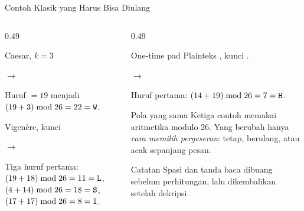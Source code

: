 \documentclass[aspectratio=169,11pt]{beamer}
\begin{document}
\begin{frame}{Contoh Klasik yang Harus Bisa Diulang}
    \scriptsize
    \begin{columns}[T,onlytextwidth]
        \begin{column}{0.49\textwidth}
            \begin{exampleblock}{Caesar, $k=3$}
                \par\vspace{2pt}
                $\longrightarrow$ 
                \par\vspace{2pt}
                Huruf  $=19$ menjadi $(19+3)\bmod 26=22=\texttt{W}$.
            \end{exampleblock}
            \begin{exampleblock}{Vigen\`ere, kunci }
                \par\vspace{2pt}
                $\longrightarrow$ 
                \par\vspace{2pt}
                Tiga huruf pertama: $(19+18)\bmod 26=11=\texttt{L}$,
                $(4+14)\bmod 26=18=\texttt{S}$,
                $(17+17)\bmod 26=8=\texttt{I}$.
            \end{exampleblock}
        \end{column}
        \begin{column}{0.49\textwidth}
            \begin{exampleblock}{One-time pad}
                Plainteks , kunci .
                \par\vspace{2pt}
                $\longrightarrow$ 
                \par\vspace{2pt}
                Huruf pertama: $(14+19)\bmod 26=7=\texttt{H}$.
            \end{exampleblock}
            \begin{alertblock}{Pola yang sama}
                Ketiga contoh memakai aritmetika modulo 26. Yang berubah hanya
                \emph{cara memilih pergeseran}: tetap, berulang, atau acak
                sepanjang pesan.
            \end{alertblock}
            \begin{block}{Catatan}
                Spasi dan tanda baca dibuang sebelum perhitungan, lalu
                dikembalikan setelah dekripsi.
            \end{block}
        \end{column}
    \end{columns}
\end{frame}
\end{document}
